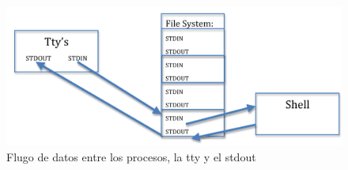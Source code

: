 \documentclass[10pt,a4paper]{article}
\begin{document}
	\begin{figure}
	\begin{center} 
	\includegraphics[angle=0, width=1\textwidth , height=0.3\textheight]{flujoTTY2.png} 
	\caption{Flugo de datos entre los procesos, la tty y el stdout}
	\end{center} 
	\end{figure}
\end{document}
